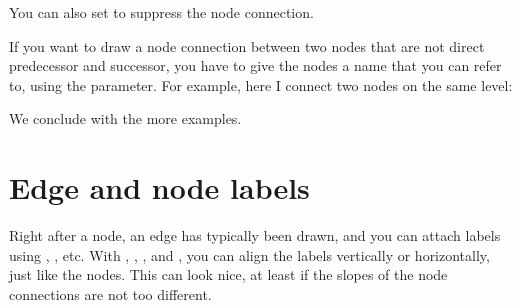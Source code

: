 \documentclass[11pt,english,BCOR10mm,DIV12,bibliography=totoc,parskip=false,smallheadings
    headexclude,footexclude,oneside]{pst-doc}
\begin{document}
\begin{LTXexample}[pos=l,width=0.4\linewidth]
  \def\dedge{\ncline[linestyle=dashed]}
  \pstree[treemode=U,radius=2pt]{\Tc{3pt}}{%
    \TC*[edge=\dedge]
    \pstree{\Tc{3pt}}{\TC*[edge=\dedge] \TC*}
    \TC*}
\end{LTXexample}

You can also set  to suppress the node connection.

If you want to draw a node connection between two nodes that are not direct
predecessor and successor, you have to give the nodes a name that you can
refer to, using the  parameter. For example, here I connect two nodes
on the same level:

\begin{LTXexample}[pos=l,width=0.4\linewidth]
\end{LTXexample}

We conclude with the more examples.

\begin{LTXexample}[pos=l,width=0.4\linewidth]
  \def\psedge{\nccurve[angleB=180, nodesepB=3pt]}
\end{LTXexample}

\begin{LTXexample}[pos=l,width=0.4\linewidth]
\end{LTXexample}

\begin{LTXexample}[pos=l,width=0.4\linewidth]
  \def\psedge#1#2{\ncangle{#2}{#1}}
\end{LTXexample}






\section{Edge and node labels}

Right after a node, an edge has typically been drawn, and you can attach
labels using , , etc.
With , , , and , you can align the labels
vertically or horizontally, just like the nodes. This can look nice, at least
if the slopes of the node connections are not too different.
\end{document}
